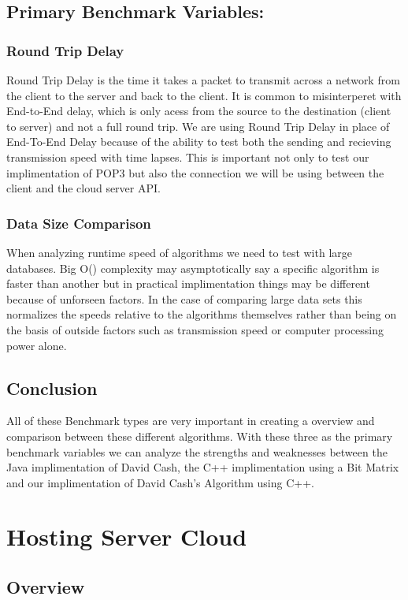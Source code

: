 \subsection{ Primary Benchmark Variables: }
\subsubsection{ Round Trip Delay }
Round Trip Delay is the time it takes a packet to transmit across a network from the client to the server and back to the client. It is common to misinterperet with End-to-End delay, which is only acess from the source to the destination (client to server) and not a full round trip. We are using Round Trip Delay in place of End-To-End Delay because of the ability to test both the sending and recieving transmission speed with time lapses. This is important not only to test our implimentation of POP3 but also the connection we will be using between the client and the cloud server API.


\subsubsection{ Data Size Comparison }
When analyzing runtime speed of algorithms we need to test with large databases. Big O() complexity may asymptotically say a specific algorithm is faster than another but in practical implimentation things may be different because of unforseen factors. In the case of comparing large data sets this normalizes the speeds relative to the algorithms themselves rather than being on the basis of outside factors such as transmission speed or computer processing power alone.



\subsection{ Conclusion }
All of these Benchmark types are very important in creating a overview and comparison between these different algorithms. With these three as the primary benchmark variables we can analyze the strengths and weaknesses between the Java implimentation of David Cash, the C++ implimentation using a Bit Matrix and our implimentation of David Cash's Algorithm using C++.
\section{ Hosting Server Cloud }


\subsection{ Overview }

